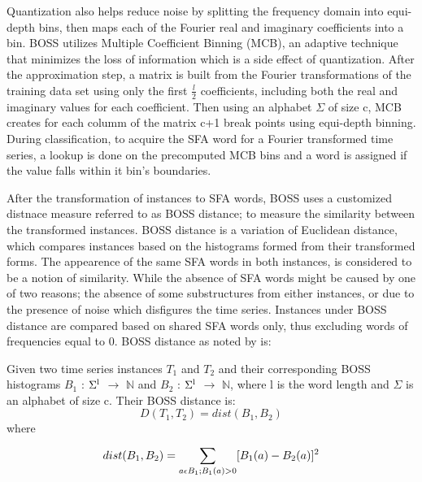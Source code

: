 Quantization also helps reduce noise by splitting the frequency domain into equi-depth bins, then maps each of the Fourier real and imaginary coefficients into a bin.
BOSS utilizes Multiple Coefficient Binning (MCB), an adaptive technique that minimizes the loss of information which is a side effect of quantization.
After the approximation step, a matrix is built from the Fourier transformations of the training data set using only the first $\frac{l}{2}$ coefficients,
including both the real and imaginary values for each coefficient. Then using an alphabet $\Sigma$ of size c, MCB creates for each columm of the matrix c+1 break points
using equi-depth binning. During classification, to acquire the SFA word for a Fourier transformed time series, a lookup is done on the precomputed MCB bins and
a word is assigned if the value falls within it bin's boundaries.

After the transformation of instances to SFA words, BOSS uses a customized distnace measure referred to as BOSS distance; to measure the similarity between the transformed instances.
BOSS distance is a variation of Euclidean distance, which compares instances based on the histograms formed from their transformed forms. The appearence of the same SFA words in both
instances, is considered to be a notion of similarity. While the absence of SFA words might be caused by one of two reasons; the absence of some substructures from either instances,
or due to the presence of noise which disfigures the time series. Instances under BOSS distance are compared based on shared SFA words only, thus excluding words of frequencies equal to 0.
BOSS distance as noted by \cite{schafer2015boss} is:

Given two time series instances $T_{1}$ and $T_{2}$ and their corresponding
BOSS histograms $B_{1}$ : $\Sigma\textsuperscript{l}$ $\to$ $\mathbb{N}$
and $B_{2}$ : $\Sigma\textsuperscript{l}$ $\to$ $\mathbb{N}$, where l is the word length and $\Sigma$ is an alphabet of size c. Their BOSS distance is:
\begin{equation}
        D(T_{1},T_{2}) = dist(B_{1},B_{2})
\end{equation}
where
\begin{equation}
    dist(B_{1},B_{2}) = \sum_{a \epsilon B_{1};B_{1}(a)>0}^{} [B_{1}(a) - B_{2}(a)]\textsuperscript{2}
\end{equation}

